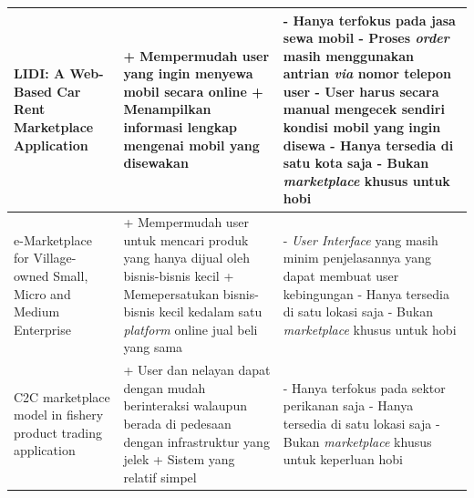 \documentclass[a4paper]{article}
\begin{document}
\begin{longtable}{|p{3cm}|p{5cm}|p{5cm}|}
    \hline
    LIDI: A Web-Based Car Rent Marketplace Application
             & + Mempermudah user yang ingin menyewa mobil secara online \newline
    + Menampilkan informasi lengkap mengenai mobil yang disewakan \newline
             & - Hanya terfokus pada jasa sewa mobil \newline
    - Proses \textit{order} masih menggunakan antrian \textit{via} nomor telepon user \newline
    - User harus secara manual mengecek sendiri kondisi mobil yang ingin disewa \newline
    - Hanya tersedia di satu kota saja \newline
    - Bukan \textit{marketplace} khusus untuk hobi                                                                                               \\
    \hline
    e-Marketplace for Village-owned Small, Micro and Medium Enterprise
             & + Mempermudah user untuk mencari produk yang hanya dijual oleh bisnis-bisnis kecil \newline
    + Memepersatukan bisnis-bisnis kecil kedalam satu \textit{platform} online jual beli yang sama \newline
             & - \textit{User Interface} yang masih minim penjelasannya yang dapat membuat user kebingungan \newline
    - Hanya tersedia di satu lokasi saja \newline
    - Bukan \textit{marketplace} khusus untuk hobi                                                                                               \\
    \hline
    C2C marketplace model in fishery product trading application
             & + User dan nelayan dapat dengan mudah berinteraksi walaupun berada di pedesaan dengan infrastruktur yang jelek \newline
    + Sistem yang relatif simpel \newline
             & - Hanya terfokus pada sektor perikanan saja \newline
    - Hanya tersedia di satu lokasi saja \newline
    - Bukan \textit{marketplace} khusus untuk keperluan hobi                                                                                     \\
    \hline
\end{longtable}
\end{document}
